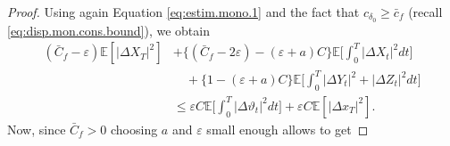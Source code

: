 \documentclass[11pt,reqno]{amsart}
\numberwithin{equation}{section}
\theoremstyle{definition}
\def\E{{\mathbb E}}
\def \E{\mathbb{E}}
\def \e{\mathrm{e}}
\begin{document}
\begin{proof}
  Using again Equation \ref{eq:estim.mono.1} and the fact that $c_{\delta_0}\ge \bar c_f$ (recall \eqref{eq:disp.mon.cons.bound}), we obtain
  \begin{align*}
    (\bar C_{f} - \varepsilon)\E[|\Delta X_T|^2]& + \Big\{(\bar C_{f} - 2\varepsilon) - (\varepsilon + a)C \Big\}\E\bigg[\int_0^T|\Delta X_t|^2dt\bigg]\\
     &\quad+ \Big\{ 1 - ( \varepsilon + a)C \Big\}\E\bigg[\int_0^T|\Delta Y_t|^2 + |\Delta Z_t|^2dt\bigg]\\
    & \le \varepsilon C\E\bigg[\int_0^T|\Delta \vartheta_t|^2dt\bigg] + \varepsilon C\E[|\Delta x_T|^2].
  \end{align*}
  Now, since $\bar C_f>0$ choosing $a$ and $\varepsilon$ small enough allows to get

\end{proof}
\end{document}
